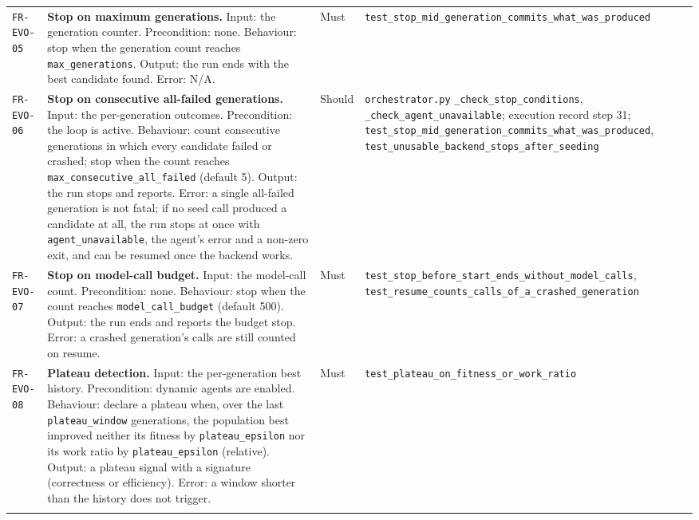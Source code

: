 \begin{longtable}{@{}>{\raggedright\arraybackslash}p{}>{\raggedright\arraybackslash}p{}p{}>{\raggedright\arraybackslash}p{}@{}}
\texttt{FR-EVO-05} & \textbf{Stop on maximum generations.} Input: the generation
counter. Precondition: none. Behaviour: stop when the generation count reaches
\texttt{max\_generations}. Output: the run ends with the best candidate found.
Error: N/A. & Must & \texttt{test\_stop\_mid\_generation\_commits\_what\_was\_produced} \\
\addlinespace[2pt]

\texttt{FR-EVO-06} & \textbf{Stop on consecutive all-failed generations.} Input:
the per-generation outcomes. Precondition: the loop is active. Behaviour: count
consecutive generations in which every candidate failed or crashed; stop when the
count reaches \texttt{max\_consecutive\_all\_failed} (default 5). Output: the run
stops and reports. Error: a single all-failed generation is not fatal; if no
seed call produced a candidate at all, the run stops at once with
\texttt{agent\_unavailable}, the agent's error and a non-zero exit, and can be
resumed once the backend works. & Should &
\texttt{orchestrator.py} \texttt{\_check\_stop\_conditions},
\texttt{\_check\_agent\_unavailable}; execution record step 31;
\texttt{test\_stop\_mid\_generation\_commits\_what\_was\_produced},
\texttt{test\_unusable\_backend\_stops\_after\_seeding} \\
\addlinespace[2pt]

\texttt{FR-EVO-07} & \textbf{Stop on model-call budget.} Input: the model-call
count. Precondition: none. Behaviour: stop when the count reaches
\texttt{model\_call\_budget} (default 500). Output: the run ends and reports the
budget stop. Error: a crashed generation's calls are still counted on resume. &
Must & \texttt{test\_stop\_before\_start\_ends\_without\_model\_calls},
\texttt{test\_resume\_counts\_calls\_of\_a\_crashed\_generation} \\
\addlinespace[2pt]

\texttt{FR-EVO-08} & \textbf{Plateau detection.} Input: the per-generation best
history. Precondition: dynamic agents are enabled. Behaviour: declare a plateau
when, over the last \texttt{plateau\_window} generations, the population best
improved neither its fitness by \texttt{plateau\_epsilon} nor its work ratio by
\texttt{plateau\_epsilon} (relative). Output: a plateau signal with a signature
(correctness or efficiency). Error: a window shorter than the history does not
trigger. & Must & \texttt{test\_plateau\_on\_fitness\_or\_work\_ratio} \\
\addlinespace[2pt]


\end{longtable}
